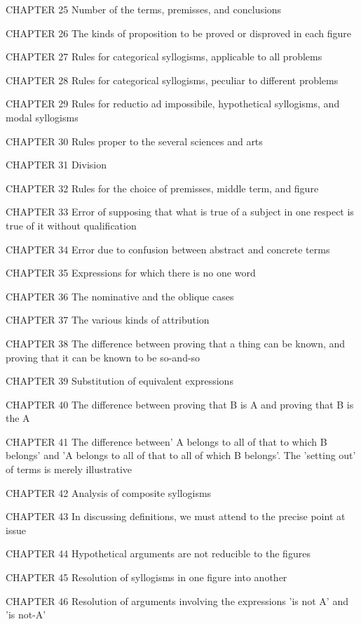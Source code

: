 CHAPTER 25
Number of the terms, premisses, and conclusions

CHAPTER 26
The kinds of proposition to be proved or disproved in each figure

CHAPTER 27
Rules for categorical syllogisms, applicable to all problems

CHAPTER 28
Rules for categorical syllogisms, peculiar to different problems

CHAPTER 29
Rules for reductio ad impossibile, hypothetical syllogisms, and
modal syllogisms

CHAPTER 30
Rules proper to the several sciences and arts

CHAPTER 31
Division

CHAPTER 32
Rules for the choice of premisses, middle term, and figure

CHAPTER 33
Error of supposing that what is true of a subject in one respect is
true of it without qualification

CHAPTER 34
Error due to confusion between abstract and concrete terms

CHAPTER 35
Expressions for which there is no one word

CHAPTER 36
The nominative and the oblique cases

CHAPTER 37
The various kinds of attribution

CHAPTER 38
The difference between proving that a thing can be known, and
proving that it can be known to be so-and-so

CHAPTER 39
Substitution of equivalent expressions

CHAPTER 40
The difference between proving that B is A and proving that B is the A

CHAPTER 41
The difference between' A belongs to all of that to which B belongs'
and 'A belongs to all of that to all of which B belongs'. The 'setting
out' of terms is merely illustrative

CHAPTER 42
Analysis of composite syllogisms

CHAPTER 43
In discussing definitions, we must attend to the precise point at issue

CHAPTER 44
Hypothetical arguments are not reducible to the figures

CHAPTER 45
Resolution of syllogisms in one figure into another

CHAPTER 46
Resolution of arguments involving the expressions 'is not A' and
'is not-A'
